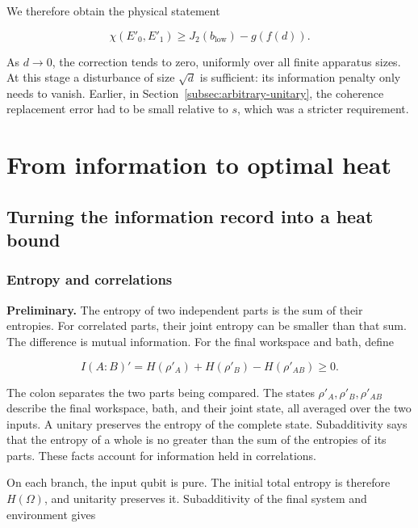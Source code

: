 \documentclass[11pt,letterpaper]{article}
\begin{document}
We therefore obtain the physical statement

\[\chi\left( E\prime_{0},E\prime_{1} \right) \geq J_{2}\left( b_{\mathrm{low}} \right) - g\left( f(d) \right).\]

As \(d \rightarrow 0\), the correction tends to zero, uniformly over all finite apparatus sizes. At this stage a disturbance of size \(\sqrt{d}\) is sufficient: its information penalty only needs to vanish. Earlier, in Section~\ref{subsec:arbitrary-unitary}, the coherence replacement error had to be small relative to \(s\), which was a stricter requirement.

\section{From information to optimal heat}\label{sec:heat}

\subsection{Turning the information record into a heat bound}\label{subsec:heat-bound}

\subsubsection{Entropy and correlations}\label{entropy-and-correlations}

\textbf{Preliminary.} The entropy of two independent parts is the sum of their entropies. For correlated parts, their joint entropy can be smaller than that sum. The difference is mutual information. For the final workspace and bath, define

\[I(A{:}B)' = H\left( \rho\prime_{A} \right) + H\left( \rho\prime_{B} \right) - H\left( \rho\prime_{AB} \right) \geq 0.\]

The colon separates the two parts being compared. The states \(\rho\prime_{A},\rho\prime_{B},\rho\prime_{AB}\) describe the final workspace, bath, and their joint state, all averaged over the two inputs. A unitary preserves the entropy of the complete state. Subadditivity says that the entropy of a whole is no greater than the sum of the entropies of its parts. These facts account for information held in correlations.

On each branch, the input qubit is pure. The initial total entropy is therefore \(H(\Omega)\), and unitarity preserves it. Subadditivity of the final system and environment gives
\end{document}
